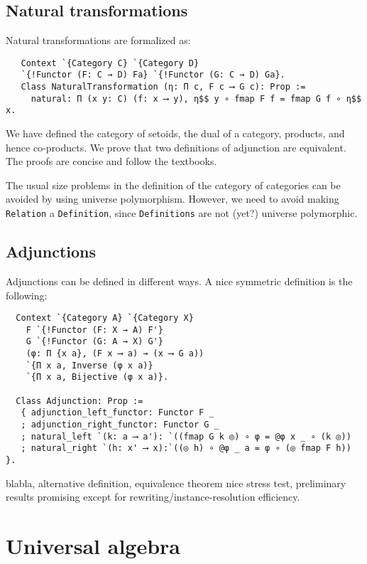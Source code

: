 \documentclass[a4paper,10pt,runningheads]{llncs}
\begin{document}
\subsection{Natural transformations}
Natural transformations are formalized as:
\begin{lstlisting}
   Context `{Category C} `{Category D}
   `{!Functor (F: C → D) Fa} `{!Functor (G: C → D) Ga}.
   Class NaturalTransformation (η: Π c, F c ⟶ G c): Prop :=
     natural: Π (x y: C) (f: x ⟶ y), η$$ y ∘ fmap F f = fmap G f ∘ η$$ x.
\end{lstlisting}
 

We have defined the category of setoids, the dual of a category, products, and hence co-products. 
We prove that two definitions of adjunction are equivalent. The proofs are concise and follow the textbooks.

The usual size problems in the definition of the category of categories can be avoided by using universe polymorphism. 
However, we need to avoid making \lstinline|Relation| a \lstinline|Definition|, since \lstinline|Definitions| are not (yet?) universe polymorphic.

\subsection{Adjunctions}

Adjunctions can be defined in different ways. A nice symmetric definition is the following:

\begin{lstlisting}
  Context `{Category A} `{Category X}
    F `{!Functor (F: X → A) F'}
    G `{!Functor (G: A → X) G'}
    (φ: Π {x a}, (F x ⟶ a) → (x ⟶ G a))
    `{Π x a, Inverse (φ x a)}
    `{Π x a, Bijective (φ x a)}.

  Class Adjunction: Prop :=
   { adjunction_left_functor: Functor F _
   ; adjunction_right_functor: Functor G _
   ; natural_left `(k: a ⟶ a'): `((fmap G k ◎) ∘ φ = @φ x _ ∘ (k ◎))
   ; natural_right `(h: x' ⟶ x):`((◎ h) ∘ @φ _ a = φ ∘ (◎ fmap F h)) }.
\end{lstlisting}

blabla, alternative definition, equivalence theorem nice stress test, preliminary results promising except for rewriting/instance-resolution efficiency.

\section{Universal algebra}\label{univ}
\end{document}
